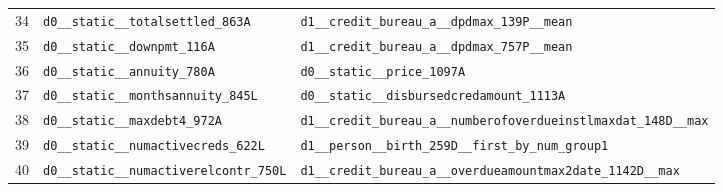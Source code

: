 \documentclass[final,5p,twocolumn]{elsarticle}
\begin{document}
\begin{table}[htbp]
\begin{threeparttable}
\begin{tabular}{@{}rL{80mm}L{80mm}@{}}
34 & \texttt{d0\_\allowbreak \_\allowbreak static\_\allowbreak \_\allowbreak totalsettled\_\allowbreak 863A} & \texttt{d1\_\allowbreak \_\allowbreak credit\_\allowbreak bureau\_\allowbreak a\_\allowbreak \_\allowbreak dpdmax\_\allowbreak 139P\_\allowbreak \_\allowbreak mean} \\
35 & \texttt{d0\_\allowbreak \_\allowbreak static\_\allowbreak \_\allowbreak downpmt\_\allowbreak 116A} & \texttt{d1\_\allowbreak \_\allowbreak credit\_\allowbreak bureau\_\allowbreak a\_\allowbreak \_\allowbreak dpdmax\_\allowbreak 757P\_\allowbreak \_\allowbreak mean} \\
36 & \texttt{d0\_\allowbreak \_\allowbreak static\_\allowbreak \_\allowbreak annuity\_\allowbreak 780A} & \texttt{d0\_\allowbreak \_\allowbreak static\_\allowbreak \_\allowbreak price\_\allowbreak 1097A} \\
37 & \texttt{d0\_\allowbreak \_\allowbreak static\_\allowbreak \_\allowbreak monthsannuity\_\allowbreak 845L} & \texttt{d0\_\allowbreak \_\allowbreak static\_\allowbreak \_\allowbreak disbursedcredamount\_\allowbreak 1113A} \\
38 & \texttt{d0\_\allowbreak \_\allowbreak static\_\allowbreak \_\allowbreak maxdebt4\_\allowbreak 972A} & \texttt{d1\_\allowbreak \_\allowbreak credit\_\allowbreak bureau\_\allowbreak a\_\allowbreak \_\allowbreak numberofoverdueinstlmaxdat\_\allowbreak 148D\_\allowbreak \_\allowbreak max} \\
39 & \texttt{d0\_\allowbreak \_\allowbreak static\_\allowbreak \_\allowbreak numactivecreds\_\allowbreak 622L} & \texttt{d1\_\allowbreak \_\allowbreak person\_\allowbreak \_\allowbreak birth\_\allowbreak 259D\_\allowbreak \_\allowbreak first\_\allowbreak by\_\allowbreak num\_\allowbreak group1} \\
40 & \texttt{d0\_\allowbreak \_\allowbreak static\_\allowbreak \_\allowbreak numactiverelcontr\_\allowbreak 750L} & \texttt{d1\_\allowbreak \_\allowbreak credit\_\allowbreak bureau\_\allowbreak a\_\allowbreak \_\allowbreak overdueamountmax2date\_\allowbreak 1142D\_\allowbreak \_\allowbreak max} \\
\bottomrule
\end{tabular}
\end{threeparttable}
\end{table}

\clearpage

\end{document}
